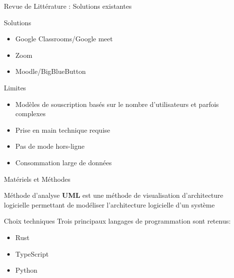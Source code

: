 \documentclass{beamer}
\begin{document}
\begin{frame}{Revue de Littérature : \small{Solutions existantes}}
  \begin{block}{Solutions}
    \begin{itemize}
      \item Google Classrooms/Google meet
      \item Zoom
      \item Moodle/BigBlueButton
    \end{itemize}
  \end{block}
  \begin{block}{Limites}
    \begin{itemize}
      \item Modèles de souscription basés sur le nombre d'utilisateurs et parfois complexes
      \item Prise en main technique requise
      \item Pas de mode hors-ligne
      \item Consommation large de données
    \end{itemize}
  \end{block}
\end{frame}
\begin{frame}{Matériels et Méthodes}
  \begin{block}{Méthode d'analyse}
    \textbf{UML} est une méthode de visualisation d’architecture
    logicielle permettant de modéliser l’architecture logicielle d’un système
  \end{block}

  \begin{block}{Choix techniques}
    Trois principaux langages de programmation sont retenus:
    \begin{itemize}
      \item Rust
      \item TypeScript
      \item Python
    \end{itemize}
  \end{block}
\end{frame}
\end{document}
